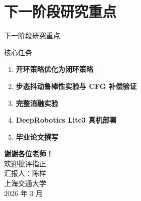 \documentclass[aspectratio=169,10pt]{beamer}
\begin{document}
\section{下一阶段研究重点}

\begin{frame}{下一阶段研究重点}
\begin{block}{核心任务}
\begin{enumerate}
\item \textbf{开环策略优化为闭环策略}
\item \textbf{步态抖动鲁棒性实验与 CFG 补偿验证}
\item \textbf{完整消融实验}
\item \textbf{DeepRobotics Lite3 真机部署}
\item \textbf{毕业论文撰写}
\end{enumerate}
\end{block}
\end{frame}

{
\begin{frame}
\begin{center}
\vspace{15mm}
{\Huge\bfseries\color{sjtuBlue} 谢谢各位老师！}\\[10mm]
{\Large 欢迎批评指正}\\[8mm]
{\large 汇报人：陈样}\\[2mm]
{\normalsize 上海交通大学}\\[2mm]
{\normalsize 2026 年 3 月}
\end{center}
\end{frame}
}
\end{document}
